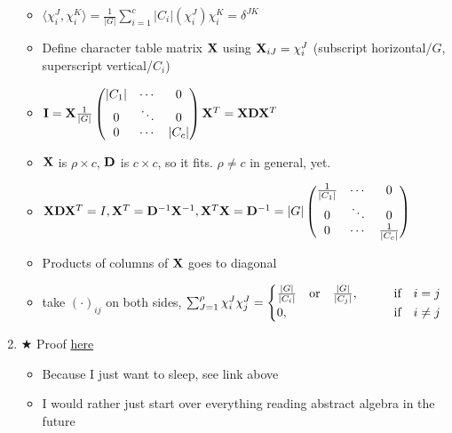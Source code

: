 \documentclass{article}
\theoremstyle{remark}
\theoremstyle{remark}
\newcommand{\myref}[1]{\hyperref[back:#1]{$\bigstar$}\label{#1}}
\begin{document}
\begin{enumerate}
\begin{itemize}
                \item $\langle\chi_i^J,\chi_i^K\rangle=\frac{1}{|G|}\sum_{i=1}^c|C_i|(\chi_i^J)\chi_i^K=\delta^{JK}$
                \item Define character table matrix $\vb{X}$ using $\vb{X}_{iJ}=\chi^J_i$ (subscript horizontal/$G$, superscript vertical/$C_i$)
                \item $\vb{I}=\vb{X}\frac{1}{|G|}\begin{pmatrix}
                        |C_1| & \cdots & 0\\
                        0 & \ddots & 0\\
                        0 & \cdots & |C_c|
                    \end{pmatrix}\vb{X}^T=\vb{X}\vb{D}\vb{X}^T$
                \item $\vb{X}$ is $\rho\times c$, $\vb{D}$ is $c\times c$, so it fits. $\rho\neq c$ in general, yet.
                \item $\vb{X}\vb{D}\vb{X}^T=I, \vb{X}^T=\vb{D}^{-1}\vb{X}^{-1}, \vb{X}^{T}\vb{X}=\vb{D}^{-1}=|G|\begin{pmatrix}
                        \frac{1}{|C_1|} & \cdots & 0\\
                        0 & \ddots & 0\\
                        0 & \cdots & \frac{1}{|C_c|}
                    \end{pmatrix}$
                \item Products of columns of $\vb{X}$ goes to diagonal
                \item take $(\cdot)_{ij}$ on both sides, $\sum_{J=1}^\rho \chi^J_i\chi^J_j = \begin{cases}
                        \frac{|G|}{|C_i|} \qor \frac{|G|}{|C_j|},&\quad \qif i=j\\
                        0,&\quad \qif i\neq j
                    \end{cases}$
            \end{itemize}
        \item \myref{thm:irrep3} Proof \href{https://math.stackexchange.com/questions/243221/proofs-that-the-degree-of-an-irrep-divides-the-order-of-a-group}{here}\begin{itemize}
                \item Because I just want to sleep, see link above
                \item I would rather just start over everything reading abstract algebra in the future
            \end{itemize}
    \end{enumerate}
\end{document}
